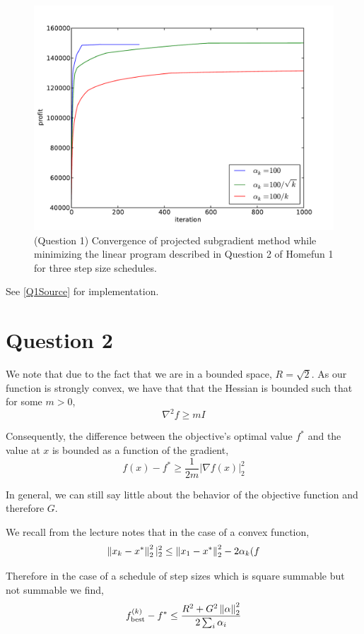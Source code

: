 \documentclass{article}
\begin{document}
\begin{figure}
  \center
  \includegraphics[scale=0.5]{q1-convergence.pdf}
  \caption{(Question 1) Convergence of projected subgradient method
while minimizing the linear program described in Question 2 of Homefun
1 for three step size schedules.}
  \label{Fig:Q1Convergence}
\end{figure}

See \ref{Q1Source} for implementation.

\section{Question 2}

We note that due to the fact that we are in a bounded space, $R =
\sqrt{2}$. As our function is strongly convex, we have that that the
Hessian is bounded such that for some $m > 0$,
\[ \nabla^2 f \ge m I \]

Consequently, the difference between the objective's optimal value
$f^*$ and the value at $x$ is bounded as a function of the gradient,
\[ f(x) - f^* \ge \frac{1}{2m} \vert \nabla f(x) \vert^2_2 \]

In general, we can still say little about the behavior of
the objective function and therefore $G$.

We recall from the lecture notes that in the case of a convex function,
\[ \left\lVert x_k - x^* \right\rVert_2^2 \vert_2^2 \le \left\lVert x_1 - x^* \right\rVert_2^2
   - 2\alpha_k (f \]

Therefore in the case of a schedule of step sizes which is square
summable but not summable we find,
\[ f_\mathrm{best}^{(k)} - f^* \le \frac{R^2 + G^2 \left\lVert \alpha \right\rVert_2^2}{2 \sum_i \alpha_i} \]
\end{document}
